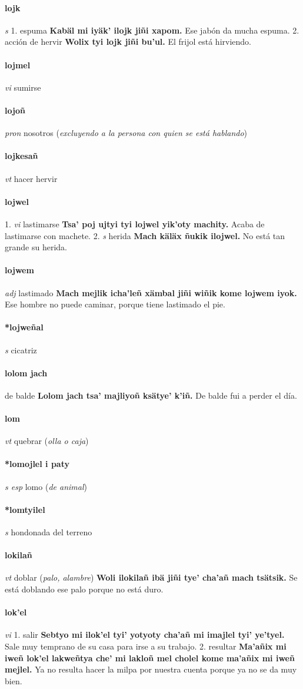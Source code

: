 \documentclass{scrbook}
\newcommand{\entry}[1]{\paragraph{#1}}
\newcommand{\onedefinition}[1]{#1.}
\newcommand{\partofspeech}[1]{\textit{#1}}
\newcommand{\spanishtranslation}[1]{#1}
\newcommand{\clarification}[1]{(\textit{#1})}
\newcommand{\cholexample}[1]{\textbf{#1}}
\newcommand{\exampletranslation}[1]{#1}
\begin{document}
\begin{multicols}{2}
\entry{lojk}
\partofspeech{s}
\onedefinition{1}
\spanishtranslation{espuma}
\cholexample{Kabäl mi iyäk' ilojk jiñi xapom.}
\exampletranslation{Ese jabón da mucha espuma.}
\onedefinition{2}
\spanishtranslation{acción de hervir}
\cholexample{Wolix tyi lojk jiñi bu'ul.}
\exampletranslation{El frijol está hirviendo.}

\entry{lojmel}
\partofspeech{vi}
\spanishtranslation{sumirse}

\entry{lojoñ}
\partofspeech{pron}
\spanishtranslation{nosotros}
\clarification{excluyendo a la persona con quien se está hablando}

\entry{lojkesañ}
\partofspeech{vt}
\spanishtranslation{hacer hervir}

\entry{lojwel}
\onedefinition{1}
\partofspeech{vi}
\spanishtranslation{lastimarse}
\cholexample{Tsa' poj ujtyi tyi lojwel yik'oty machity.}
\exampletranslation{Acaba de lastimarse con machete.}
\onedefinition{2}
\partofspeech{s}
\spanishtranslation{herida}
\cholexample{Mach käläx ñukik ilojwel.}
\exampletranslation{No está tan grande su herida.}

\entry{lojwem}
\partofspeech{adj}
\spanishtranslation{lastimado}
\cholexample{Mach mejlik icha'leñ xämbal jiñi wiñik kome lojwem iyok.}
\exampletranslation{Ese hombre no puede caminar, porque tiene lastimado el pie.}

\entry{*lojweñal}
\partofspeech{s}
\spanishtranslation{cicatriz}

\entry{lolom jach}
\spanishtranslation{de balde}
\cholexample{Lolom jach tsa' majliyoñ ksätye' k'iñ.}
\exampletranslation{De balde fui a perder el día.}

\entry{lom}
\partofspeech{vt}
\spanishtranslation{quebrar}
\clarification{olla o caja}

\entry{*lomojlel i paty}
\partofspeech{s esp}
\spanishtranslation{lomo}
\clarification{de animal}

\entry{*lomtyilel}
\partofspeech{s}
\spanishtranslation{hondonada del terreno}

\entry{lokilañ}
\partofspeech{vt}
\spanishtranslation{doblar}
\clarification{palo, alambre}
\cholexample{Woli ilokilañ ibä jiñi tye' cha'añ mach tsätsik.}
\exampletranslation{Se está doblando ese palo porque no está duro.}

\entry{lok'el}
\partofspeech{vi}
\onedefinition{1}
\spanishtranslation{salir}
\cholexample{Sebtyo mi ilok'el tyi' yotyoty cha'añ mi imajlel tyi' ye'tyel.}
\exampletranslation{Sale muy temprano de su casa para irse a su trabajo.}
\onedefinition{2}
\spanishtranslation{resultar}
\cholexample{Ma'añix mi iweñ lok'el lakweñtya che' mi lakloñ mel cholel kome ma'añix mi iweñ mejlel.}
\exampletranslation{Ya no resulta hacer la milpa por nuestra cuenta porque ya no se da muy bien.}


\end{multicols}
\end{document}

